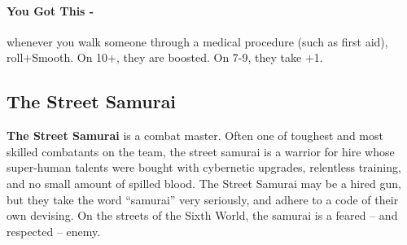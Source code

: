 \paragraph{You Got This -} whenever you walk someone through a medical procedure (such as first aid), roll+Smooth. On 10+, they are boosted. On 7-9, they take +1.



\clearpage
\subsection{The Street Samurai}
\textbf{The Street Samurai} is a combat master. Often one of toughest and most skilled combatants on the team, the street samurai is a warrior for hire whose super-human talents were bought with cybernetic upgrades, relentless training, and no small amount of spilled blood. The Street Samurai may be a hired gun, but they take the word “samurai” very seriously, and adhere to a code of their own devising. On the streets of the Sixth World, the samurai is a feared -- and respected -- enemy.

